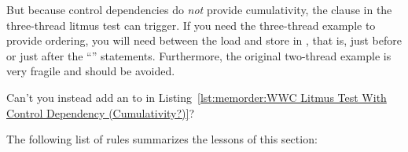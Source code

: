 But because control dependencies do \emph{not} provide cumulativity, the
 clause in the three-thread litmus test can trigger.
If you need the three-thread example to provide ordering, you will need
 between the load and store in ,
that is, just before or just after the ``'' statements.
Furthermore, the original two-thread example is very fragile and should be avoided.

\QuickQuiz{}
	Can't you instead add an  to  in
	Listing~\ref{lst:memorder:WWC Litmus Test With Control Dependency (Cumulativity?)}?
 \QuickQuizEnd

The following list of rules summarizes the lessons of this section:
\fi

